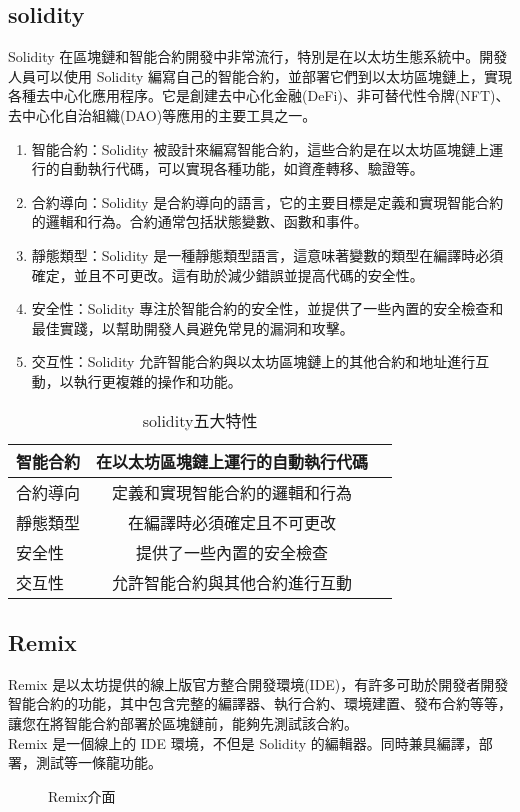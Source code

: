 \subsection{solidity}
Solidity 在區塊鏈和智能合約開發中非常流行，特別是在以太坊生態系統中。開發人員可以使用 Solidity 編寫自己的智能合約，並部署它們到以太坊區塊鏈上，實現各種去中心化應用程序。它是創建去中心化金融(DeFi)、非可替代性令牌(NFT)、去中心化自治組織(DAO)等應用的主要工具之一。
\begin{enumerate}
\item 智能合約：Solidity 被設計來編寫智能合約，這些合約是在以太坊區塊鏈上運行的自動執行代碼，可以實現各種功能，如資產轉移、驗證等。
\item 合約導向：Solidity 是合約導向的語言，它的主要目標是定義和實現智能合約的邏輯和行為。合約通常包括狀態變數、函數和事件。
\item 靜態類型：Solidity 是一種靜態類型語言，這意味著變數的類型在編譯時必須確定，並且不可更改。這有助於減少錯誤並提高代碼的安全性。
\item 安全性：Solidity 專注於智能合約的安全性，並提供了一些內置的安全檢查和最佳實踐，以幫助開發人員避免常見的漏洞和攻擊。
\item 交互性：Solidity 允許智能合約與以太坊區塊鏈上的其他合約和地址進行互動，以執行更複雜的操作和功能。
\end{enumerate}

\begin{table}[h]
\centering
\caption{solidity五大特性}\label{tb:solidity五大特性}  
\extrarowheight=6pt  
\colorbox{bubbles}{\begin{tabular}{lcc}
\hline
  智能合約	& 在以太坊區塊鏈上運行的自動執行代碼\\\hline  
  合約導向	& 定義和實現智能合約的邏輯和行為	\\\hline
  靜態類型 	& 在編譯時必須確定且不可更改		\\\hline
  安全性 	    & 提供了一些內置的安全檢查		    \\\hline
  交互性   	& 允許智能合約與其他合約進行互動		\\\hline
\end{tabular}}
\end{table}
\subsection{Remix}
Remix 是以太坊提供的線上版官方整合開發環境(IDE)，有許多可助於開發者開發智能合約的功能，其中包含完整的編譯器、執行合約、環境建置、發布合約等等，讓您在將智能合約部署於區塊鏈前，能夠先測試該合約。\\
Remix 是一個線上的 IDE 環境，不但是 Solidity 的編輯器。同時兼具編譯，部署，測試等一條龍功能。
\begin{figure}[h]
    \caption{Remix介面}
    \label{fig:Remix}
\end{figure}
